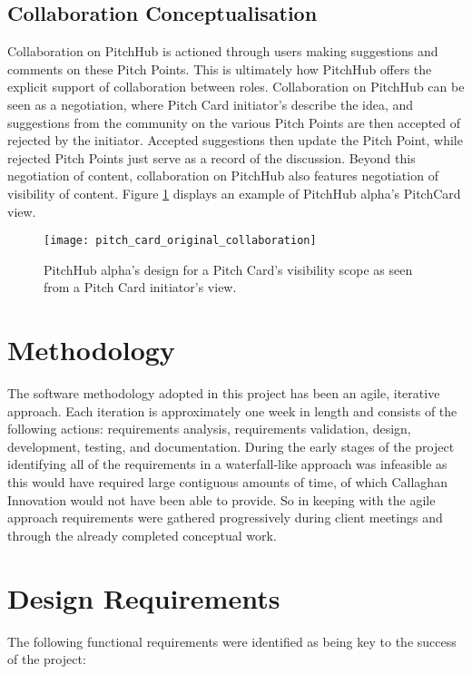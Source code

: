 \subsection{Collaboration Conceptualisation}
Collaboration on PitchHub is actioned through users making suggestions and comments on these Pitch Points. This is ultimately how PitchHub offers the explicit support of collaboration between roles. Collaboration on PitchHub can be seen as a negotiation, where Pitch Card initiator's describe the idea, and suggestions from the community on the various Pitch Points are then accepted of rejected by the initiator. Accepted suggestions then update the Pitch Point, while rejected Pitch Points just serve as a record of the discussion. Beyond this negotiation of content, collaboration on PitchHub also features negotiation of visibility of content. Figure \ref{fig:pitch_card_original_collaboration} displays an example of PitchHub alpha's PitchCard view.
\begin{figure}[ht]
    \centering
    \texttt{[image: pitch\_card\_original\_collaboration]}
    \caption{PitchHub alpha's design for a Pitch Card's visibility scope as seen from a Pitch Card initiator's view.}
    \label{fig:pitch_card_original_collaboration}
\end{figure}

\section{Methodology}
The software methodology adopted in this project has been an agile, iterative approach. Each iteration is approximately one week in length and consists of the following actions: requirements analysis, requirements validation, design, development, testing, and documentation. During the early stages of the project identifying all of the requirements in a waterfall-like approach was infeasible as this would have required large contiguous amounts of time, of which Callaghan Innovation would not have been able to provide. So in keeping with the agile approach requirements were gathered progressively during client meetings and through the already completed conceptual work. 

\section{Design Requirements}
The following functional requirements were identified as being key to the success of the project:

